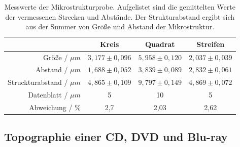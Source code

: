 \begin{table}
	\centering
	\caption{Messwerte der Mikrostrukturprobe. Aufgelistet sind die gemittelten Werte der vermessenen Strecken und Abst\"ande. Der Strukturabstand ergibt sich aus der Summer von Gr\"o{\ss}e und Abstand der Mikrostruktur.}
\begin{tabular}{|r|ccc|}
	\hline
	{} & {Kreis} & {Quadrat} & {Streifen} \\
	\hline
	Größe / $\mu m$ & $3,177 \pm 0,096$ & $5,958 \pm 0,120$ & $2,037 \pm 0,039$ \\
	Abstand / $\mu m$ & $1,688 \pm 0,052$ & $3,839 \pm 0,089$ & $2,832 \pm 0,061$ \\
	Struckturabstand / $\mu m$ & $4,865 \pm 0,109$ & $ 9,797 \pm 0,149$ & $4,869 \pm 0,072$ \\
	Datenblatt / $\mu m$ & 5 & 10 & 5 \\
	Abweichung / \%	& 2,7 & 2,03 & 2,62 \\
	\hline
\end{tabular}
\label{tab:auf1}
\end{table}


\subsection{Topographie einer CD, DVD und Blu-ray}

